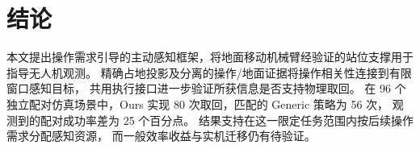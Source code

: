 \section{结论}
本文提出操作需求引导的主动感知框架，将地面移动机械臂经验证的站位支撑用于指导无人机观测。
精确占地投影及分离的操作/地面证据将操作相关性连接到有限窗口感知目标，
共用执行接口进一步验证所获信息是否支持物理取回。
在 96 个独立配对仿真场景中，Ours 实现 80 次取回，匹配的 Generic 策略为 56 次，
观测到的配对成功率差为 25 个百分点。
结果支持在这一限定任务范围内按后续操作需求分配感知资源，
而一般效率收益与实机迁移仍有待验证。
